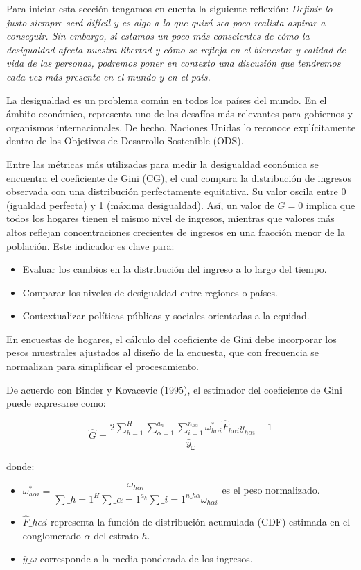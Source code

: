 \documentclass[
  spanish,
  12pt,
]{book}
\providecommand{\tightlist}{%
  \setlength{\itemsep}{0pt}\setlength{\parskip}{0pt}}
\begin{document}
Para iniciar esta sección tengamos en cuenta la siguiente reflexión: \emph{Definir lo justo siempre será difícil y es algo a lo que quizá sea poco realista aspirar a conseguir. Sin embargo, si estamos un poco más conscientes de cómo la desigualdad afecta nuestra libertad y cómo se refleja en el bienestar y calidad de vida de las personas, podremos poner en contexto una discusión que tendremos cada vez más presente en el mundo y en el país.}

La desigualdad es un problema común en todos los países del mundo. En el ámbito económico, representa uno de los desafíos más relevantes para gobiernos y organismos internacionales. De hecho, Naciones Unidas lo reconoce explícitamente dentro de los Objetivos de Desarrollo Sostenible (ODS).

Entre las métricas más utilizadas para medir la desigualdad económica se encuentra el coeficiente de Gini (CG), el cual compara la distribución de ingresos observada con una distribución perfectamente equitativa. Su valor oscila entre 0 (igualdad perfecta) y 1 (máxima desigualdad). Así, un valor de \(G = 0\) implica que todos los hogares tienen el mismo nivel de ingresos, mientras que valores más altos reflejan concentraciones crecientes de ingresos en una fracción menor de la población. Este indicador es clave para:

\begin{itemize}
\tightlist
\item
  Evaluar los cambios en la distribución del ingreso a lo largo del tiempo.
\item
  Comparar los niveles de desigualdad entre regiones o países.
\item
  Contextualizar políticas públicas y sociales orientadas a la equidad.
\end{itemize}

En encuestas de hogares, el cálculo del coeficiente de Gini debe incorporar los pesos muestrales ajustados al diseño de la encuesta, que con frecuencia se normalizan para simplificar el procesamiento.

De acuerdo con Binder y Kovacevic (1995), el estimador del coeficiente de Gini puede expresarse como:

\[
\hat{G} = \frac{2\sum_{h=1}^{H}\sum_{\alpha=1}^{a_{h}}\sum_{i=1}^{n_{h\alpha}}\omega_{h\alpha i}^{*}\hat{F}_{h\alpha i}y_{h\alpha i}-1}{\bar{y}_{\omega}}
\]

donde:

\begin{itemize}
\tightlist
\item
  \(\omega_{h\alpha i}^{*}=\dfrac{\omega_{h\alpha i}}{\sum\_{h=1}^{H}\sum\_{\alpha=1}^{a_{h}}\sum\_{i=1}^{n\_{h\alpha}}\omega_{h\alpha i}}\) es el peso normalizado.
\item
  \(\hat{F}\_{h\alpha i}\) representa la función de distribución acumulada (CDF) estimada en el conglomerado \(\alpha\) del estrato \(h\).
\item
  \(\bar{y}\_{\omega}\) corresponde a la media ponderada de los ingresos.
\end{itemize}
\end{document}
